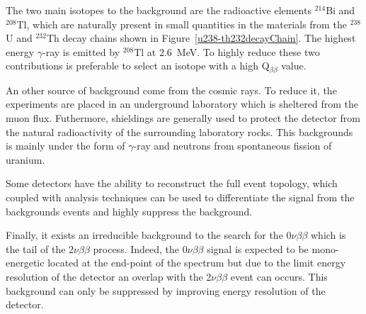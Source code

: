 \documentclass[main.tex]{subfiles}
\begin{document}
\bigskip


\NI The two main isotopes to the background are the radioactive elements $^{214}$Bi and $^{208}$Tl, which are naturally present in small quantities in the materials from the $^{238}$U and $^{232}$Th decay chains shown in Figure~\ref{u238-th232decayChain}. The highest energy $\gamma$-ray is emitted by $^{208}$Tl at 2.6~MeV. To highly reduce these two contributions is preferable to select an isotope with a high Q$_{\beta\beta}$ value.


\bigskip

\NI An other source of background come from the cosmic rays. To reduce it, the experiments are placed in an underground laboratory which is sheltered from the muon flux. Futhermore, shieldings are generally used to protect the detector from the natural radioactivity of the surrounding laboratory rocks. This backgrounds is mainly under the form of $\gamma$-ray and neutrons from spontaneous fission of uranium.


\bigskip


\NI Some detectors have the ability to reconstruct the full event topology,  which coupled with analysis techniques can be used to differentiate the signal from the backgrounds events and highly suppress the background.


\bigskip


\NI Finally, it exists an irreducible background to the search for the 0$\nu\beta\beta$ which is the tail of the  2$\nu\beta\beta$ process. Indeed, the 0$\nu\beta\beta$ signal is expected to be mono-energetic located at the end-point of the spectrum but due to the limit energy resolution of the detector an overlap with the 2$\nu\beta\beta$ event can occurs. This background can only be suppressed by improving energy resolution of the detector.  
\end{document}
